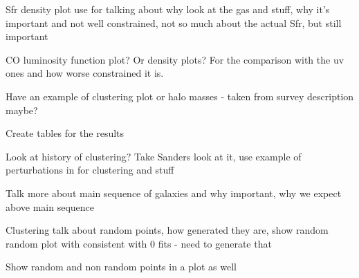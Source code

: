 Sfr density plot use for talking about why look at the gas and stuff, why it's important and not well constrained, not so much about the actual Sfr, but still important 

CO luminosity function plot? Or density plots? For the comparison with the uv ones and how worse constrained it is. 

Have an example of clustering plot or halo masses - taken from survey description maybe? 

Create tables for the results 

Look at history of clustering? Take Sanders look at it, use example of perturbations in for clustering and stuff 


Talk more about main sequence of galaxies and why important, why we expect above main sequence 

Clustering talk about random points, how generated they are, show random random plot with consistent with 0 fits - need to generate that 

Show random and non random points in a plot as well


